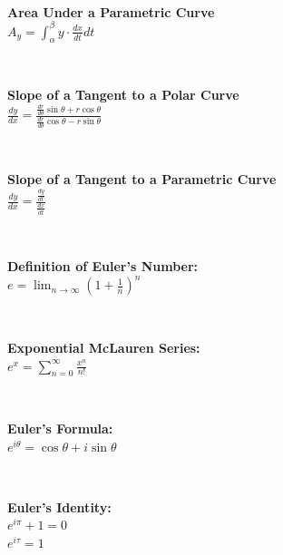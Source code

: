 \\ \begin{minipage}{\textwidth}
    \textbf{Area Under a Parametric Curve}
    \\ \( A_y = \displaystyle\int_\alpha^\beta { y \cdot \displaystyle\frac{ dx }{ dt } dt } \)
\end{minipage}
\\ \begin{minipage}{\textwidth}
    \textbf{Slope of a Tangent to a Polar Curve}
    \\ \( \displaystyle\frac{ dy }{ dx } = \displaystyle\frac{ \frac{ dr }{ d \theta } \sin \theta + r \cos \theta }{ \frac{ dr }{ d \theta } \cos \theta - r \sin \theta } \)
\end{minipage}
\\ \begin{minipage}{\textwidth}
    \textbf{Slope of a Tangent to a Parametric Curve}
    \\ \( \displaystyle\frac{ dy }{ dx } = \displaystyle\frac{ \frac{ dy }{ dt } }{ \frac{ dx }{ dt } } \)
\end{minipage}
\\ \begin{minipage}{\textwidth}
    \textbf{Definition of Euler's Number:}
    \\ \( e = \displaystyle\lim_{n \rightarrow{\infty}} { \left( 1 + \displaystyle\frac{ 1 }{ n } \right)^n } \)
\end{minipage}
\\ \begin{minipage}{\textwidth}
    \textbf{Exponential McLauren Series:}
    \\ \( e^x = \displaystyle\sum_{n = 0}^{\infty} { \displaystyle\frac{ x^n }{ n! } } \)
\end{minipage}
\\ \begin{minipage}{\textwidth}
    \textbf{Euler's Formula:}
    \\ \( e^{i\theta} = \cos{\theta} + i\sin{\theta} \)
\end{minipage}
\\ \begin{minipage}{\textwidth}
    \textbf{Euler's Identity:}
    \\ \( e^{i \pi} + 1 = 0 \)
    \\ \( e^{i\tau} = 1  \)
\end{minipage}
